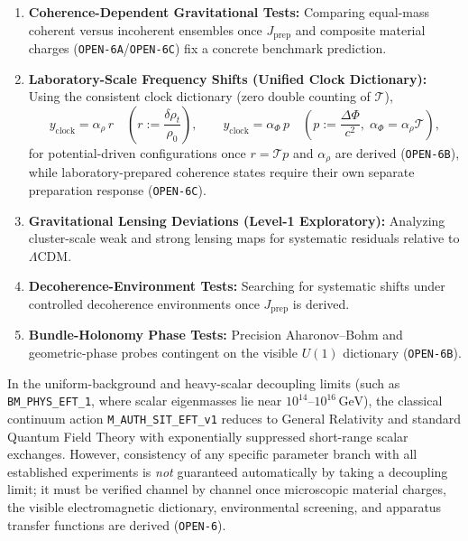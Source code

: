 \begin{enumerate}
    \item \textbf{Coherence-Dependent Gravitational Tests:} Comparing equal-mass coherent versus incoherent ensembles once $J_{\mathrm{prep}}$ and composite material charges (\texttt{OPEN-6A}/\texttt{OPEN-6C}) fix a concrete benchmark prediction.

    \item \textbf{Laboratory-Scale Frequency Shifts (Unified Clock Dictionary):} Using the consistent clock dictionary (zero double counting of $\mathcal{T}$),
    \[
    y_{\mathrm{clock}} = \alpha_\rho\,r \quad \left(r := \frac{\delta\rho_t}{\rho_0}\right),
    \qquad
    y_{\mathrm{clock}} = \alpha_\Phi\,p \quad \left(p := \frac{\Delta\Phi}{c^2},\;\alpha_\Phi = \alpha_\rho\mathcal{T}\right),
    \]
    for potential-driven configurations once $r = \mathcal{T} p$ and $\alpha_\rho$ are derived (\texttt{OPEN-6B}), while laboratory-prepared coherence states require their own separate preparation response (\texttt{OPEN-6C}).

    \item \textbf{Gravitational Lensing Deviations (Level-1 Exploratory):} Analyzing cluster-scale weak and strong lensing maps for systematic residuals relative to $\Lambda$CDM.

    \item \textbf{Decoherence-Environment Tests:} Searching for systematic shifts under controlled decoherence environments once $J_{\mathrm{prep}}$ is derived.

    \item \textbf{Bundle-Holonomy Phase Tests:} Precision Aharonov--Bohm and geometric-phase probes contingent on the visible $U(1)$ dictionary (\texttt{OPEN-6B}).
\end{enumerate}

In the uniform-background and heavy-scalar decoupling limits (such as \texttt{BM\_PHYS\_EFT\_1}, where scalar eigenmasses lie near $10^{14}\text{--}10^{16}\,\mathrm{GeV}$), the classical continuum action \texttt{M\_AUTH\_SIT\_EFT\_v1} reduces to General Relativity and standard Quantum Field Theory with exponentially suppressed short-range scalar exchanges. However, consistency of any specific parameter branch with all established experiments is \emph{not} guaranteed automatically by taking a decoupling limit; it must be verified channel by channel once microscopic material charges, the visible electromagnetic dictionary, environmental screening, and apparatus transfer functions are derived (\texttt{OPEN-6}).

